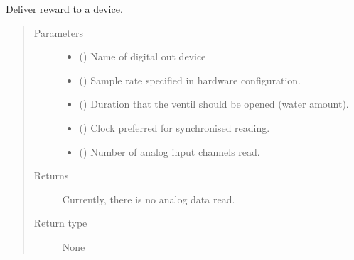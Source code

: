 \documentclass[letterpaper,10pt,english]{sphinxmanual}
\begin{document}
\begin{fulllineitems}
\label{\detokenize{NoSeMazeControl/HelperFunctions:HelperFunctions.Reward.deliver_reward}}
\pysigstartsignatures
{}
\pysigstopsignatures
\sphinxAtStartPar
Deliver reward to a device.
\begin{quote}\begin{description}
\item[{Parameters}] \leavevmode\begin{itemize}
\item {} 
\sphinxAtStartPar
{} () \textendash{} Name of digital out device

\item {} 
\sphinxAtStartPar
{} () \textendash{} Sample rate specified in hardware configuration.

\item {} 
\sphinxAtStartPar
{} () \textendash{} Duration that the ventil should be opened (water amount).

\item {} 
\sphinxAtStartPar
{} () \textendash{} Clock preferred for synchronised reading.

\item {} 
\sphinxAtStartPar
{} () \textendash{} Number of analog input channels read.

\end{itemize}

\item[{Returns}] \leavevmode
\sphinxAtStartPar
{} \textendash{} Currently, there is no analog data read.

\item[{Return type}] \leavevmode
\sphinxAtStartPar
None

\end{description}\end{quote}

\end{fulllineitems}
\end{document}
